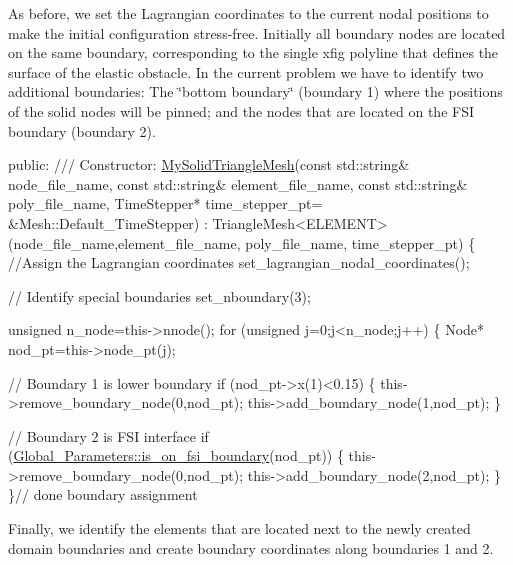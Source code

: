 As before, we set the Lagrangian coordinates to the current nodal positions to make the initial configuration stress-\/free. Initially all boundary nodes are located on the same boundary, corresponding to the single xfig polyline that defines the surface of the elastic obstacle. In the current problem we have to identify two additional boundaries\+: The \char`\"{}bottom boundary\char`\"{} (boundary 1) where the positions of the solid nodes will be pinned; and the nodes that are located on the F\+SI boundary (boundary 2).


\begin{DoxyCodeInclude}
 
\textcolor{keyword}{public}:
 \textcolor{comment}{}
\textcolor{comment}{ /// Constructor: }
\textcolor{comment}{} \hyperlink{classMySolidTriangleMesh}{MySolidTriangleMesh}(\textcolor{keyword}{const} std::string& node\_file\_name,
                     \textcolor{keyword}{const} std::string& element\_file\_name,
                     \textcolor{keyword}{const} std::string& poly\_file\_name,
                     TimeStepper* time\_stepper\_pt=
                     &Mesh::Default\_TimeStepper) :
  TriangleMesh<ELEMENT>(node\_file\_name,element\_file\_name,
                        poly\_file\_name, time\_stepper\_pt)
  \{
   \textcolor{comment}{//Assign the Lagrangian coordinates}
   set\_lagrangian\_nodal\_coordinates();

   \textcolor{comment}{// Identify special boundaries}
   set\_nboundary(3);

   \textcolor{keywordtype}{unsigned} n\_node=this->nnode();
   \textcolor{keywordflow}{for} (\textcolor{keywordtype}{unsigned} j=0;j<n\_node;j++)
    \{
     Node* nod\_pt=this->node\_pt(j);

     \textcolor{comment}{// Boundary 1 is lower boundary}
     \textcolor{keywordflow}{if} (nod\_pt->x(1)<0.15)
      \{
       this->remove\_boundary\_node(0,nod\_pt);
       this->add\_boundary\_node(1,nod\_pt);
      \}

     \textcolor{comment}{// Boundary 2 is FSI interface}
     \textcolor{keywordflow}{if} (\hyperlink{namespaceGlobal__Parameters_a655abf819eb3045dac883f2b7073ba22}{Global\_Parameters::is\_on\_fsi\_boundary}(nod\_pt))
      \{
       this->remove\_boundary\_node(0,nod\_pt);
       this->add\_boundary\_node(2,nod\_pt);
      \}
    \}\textcolor{comment}{// done boundary assignment}

\end{DoxyCodeInclude}


Finally, we identify the elements that are located next to the newly created domain boundaries and create boundary coordinates along boundaries 1 and 2.


